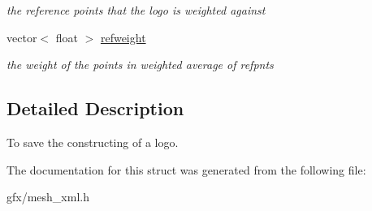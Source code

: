 \begin{DoxyCompactItemize}
\begin{DoxyCompactList}\small\item\em the reference points that the logo is weighted against \end{DoxyCompactList}\item 
vector$<$ float $>$ \hyperlink{structMeshXML_1_1ZeLogo_a1138e94a20e66ceda155824ae611c0e2}{refweight}\hypertarget{structMeshXML_1_1ZeLogo_a1138e94a20e66ceda155824ae611c0e2}{}\label{structMeshXML_1_1ZeLogo_a1138e94a20e66ceda155824ae611c0e2}

\begin{DoxyCompactList}\small\item\em the weight of the points in weighted average of refpnts \end{DoxyCompactList}\end{DoxyCompactItemize}


\subsection{Detailed Description}
To save the constructing of a logo. 

The documentation for this struct was generated from the following file\+:\begin{DoxyCompactItemize}
\item 
gfx/mesh\+\_\+xml.\+h\end{DoxyCompactItemize}
